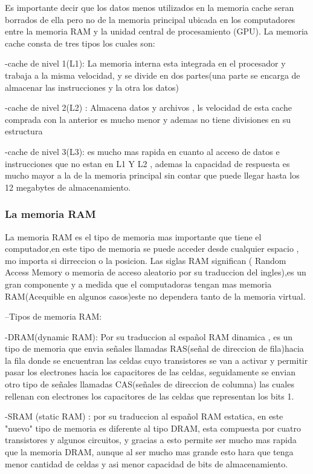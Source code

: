 \documentclass{article}
\begin{document}
        Es importante decir que los datos menos utilizados en la memoria cache seran borrados de ella pero no de la memoria principal
        ubicada en los computadores entre la memoria RAM y la unidad central de procesamiento (GPU).
        La memoria cache consta de tres tipos los cuales son:
            
           
            -cache de nivel 1(L1): La memoria interna  esta integrada en el procesador y trabaja a la misma velocidad, y se divide en dos partes(una parte se encarga de almacenar las instrucciones y la otra los datos)
            
            
            -cache de nivel 2(L2) : Almacena datos y archivos , ls velocidad de esta cache comprada con la anterior es mucho menor y ademas no tiene divisiones en su estructura
            
           
            -cache de nivel 3(L3): es mucho mas rapida en cuanto al acceso de datos e instrucciones que no estan en L1 Y L2 , ademas la capacidad de respuesta es mucho mayor a la de la memoria principal sin contar que puede llegar hasta los 12 megabytes de almacenamiento.
        
        \subsubsection{La memoria RAM}
        La memoria RAM es el tipo de memoria mas importante que tiene el computador,en este tipo de memoria se puede acceder desde cualquier espacio , mo importa si dirreccion o la posicion. Las siglas RAM significan ( Random Access Memory o memoria de acceso aleatorio por su traduccion del ingles),es un gran componente y a medida que el computadoras tengan mas memoria RAM(Acequible en algunos casos)este no dependera tanto de la memoria virtual.
        
        --Tipos de memoria RAM:
            
            -DRAM(dynamic RAM): Por su traduccion al español RAM dinamica , es un tipo de memoria que envia señales llamadas RAS(señal de direccion de fila)hacia la fila donde se encuentran las celdas cuyo transistores se van a activar y permitir  pasar los electrones hacia los capacitores de las celdas, seguidamente se envian otro tipo de señales llamadas CAS(señales de direccion de columna) las cuales  rellenan con electrones los capacitores de las celdas que representan los bits 1.
            
            -SRAM (static RAM) : por su traduccion al español RAM estatica, en este "nuevo" tipo de memoria es diferente al tipo DRAM, esta compuesta por cuatro transistores y algunos circuitos, y gracias a esto permite ser mucho mas rapida que la memoria DRAM, aunque al ser mucho mas grande esto hara que tenga menor cantidad de celdas y asi menor capacidad de bits de almacenamiento.
            
\end{document}
